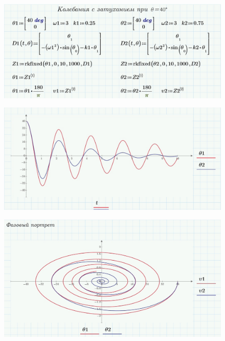 \documentclass[a4paper, 14pt]{extarticle}
\begin{document}
		\begin{figure}[H]
			\centering
			\includegraphics[width = \linewidth]{13.jpg}
		\end{figure}
		\begin{figure}[H]
			\centering
			\includegraphics[width = \linewidth]{14.jpg}
		\end{figure}
		\begin{figure}[H]
			\centering
			\includegraphics[width = \linewidth]{15.jpg}
		\end{figure}
\end{document}
